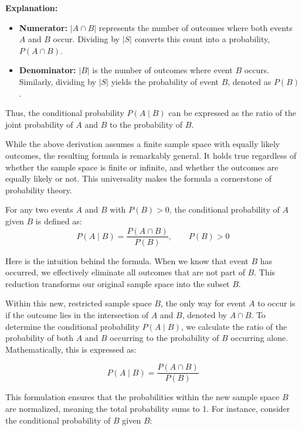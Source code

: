 \textbf{Explanation:}

\begin{itemize}
    \item \textbf{Numerator:} \( |A \cap B| \) represents the number of outcomes where both events \( A \) and \( B \) occur. Dividing by \( |S| \) converts this count into a probability, \( P(A \cap B) \).
    \item \textbf{Denominator:} \( |B| \) is the number of outcomes where event \( B \) occurs. Similarly, dividing by \( |S| \) yields the probability of event \( B \), denoted as \( P(B) \).
\end{itemize}

Thus, the conditional probability \( P(A \mid B) \) can be expressed as the ratio of the joint probability of \( A \) and \( B \) to the probability of \( B \).

While the above derivation assumes a finite sample space with equally likely outcomes, the resulting formula is remarkably general. It holds true regardless of whether the sample space is finite or infinite, and whether the outcomes are equally likely or not. This universality makes the formula a cornerstone of probability theory.

\begin{definition}
For any two events \( A \) and \( B \) with \( P(B) > 0 \), the conditional probability of \( A \) given \( B \) is defined as:
\[
P(A \mid B) = \frac{P(A \cap B)}{P(B)}, \qquad P(B) > 0
\]
\end{definition}

Here is the intuition behind the formula. When we know that event \( B \) has occurred, we effectively eliminate all outcomes that are not part of \( B \). This reduction transforms our original sample space into the subset \( B \).

Within this new, restricted sample space \( B \), the only way for event \( A \) to occur is if the outcome lies in the intersection of \( A \) and \( B \), denoted by \( A \cap B \). To determine the conditional probability \( P(A \mid B) \), we calculate the ratio of the probability of both \( A \) and \( B \) occurring to the probability of \( B \) occurring alone. Mathematically, this is expressed as:

\[
P(A \mid B) = \frac{P(A \cap B)}{P(B)}
\]

This formulation ensures that the probabilities within the new sample space \( B \) are normalized, meaning the total probability sums to 1. For instance, consider the conditional probability of \( B \) given \( B \):


